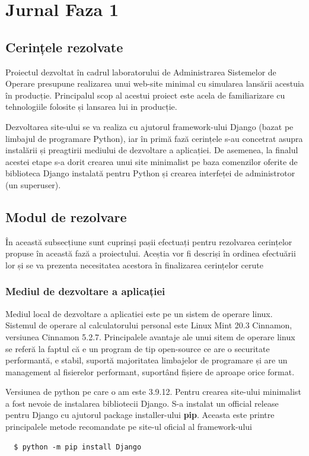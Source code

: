 \section{Jurnal Faza 1}

\setlength\parindent{24pt}
\subsection{Cerințele rezolvate}
\hspace{\parindent}
Proiectul dezvoltat în cadrul laboratorului de Administrarea Sistemelor de Operare presupune realizarea unui web-site minimal cu simularea lansării acestuia în producție. Principalul scop al acestui proiect  este acela de familiarizare cu tehnologiile folosite și lansarea lui in producție. \newline
\par Dezvoltarea site-ului se va realiza cu ajutorul framework-ului Django (bazat pe limbajul de programare Python), iar în primă fază cerințele s-au concetrat asupra instalării și preagtirii mediului de dezvoltare a aplicației. De asemenea, la finalul acestei etape s-a dorit crearea unui site minimalist pe baza comenzilor oferite de biblioteca Django instalată pentru Python și crearea interfeței de administrotor (un superuser).

\subsection{Modul de rezolvare}
\hspace{\parindent}În această subsecțiune sunt cuprinși pașii efectuați pentru rezolvarea cerințelor propuse în această fază a proiectului. Aceștia vor fi descriși în ordinea efectuării lor și se va prezenta necesitatea acestora în finalizarea cerințelor cerute 

\subsubsection{Mediul de dezvoltare a aplicației}
\hspace{\parindent}
Mediul local de dezvoltare a aplicatiei este pe un sistem de operare linux. Sistemul de operare al calculatorului personal este Linux Mint 20.3 Cinnamon, versiunea Cinnamon 5.2.7. Principalele avantaje ale unui sitem de operare linux se referă la faptul că e un program de tip open-source ce are o securitate performantă, e stabil, suportă majoritatea limbajelor de programare și are un management al fisierelor performant, suportând fișiere de aproape orice format. \par
Versiunea de python pe care o am este 3.9.12. Pentru crearea site-ului minimalist a fost nevoie de instalarea bibliotecii Django. S-a instalat un official release pentru Django cu ajutorul package installer-ului \textbf{pip}. Aceasta este printre principalele metode recomandate pe site-ul oficial al framework-ului 
\begin{verbatim}
  $ python -m pip install Django
\end{verbatim}

